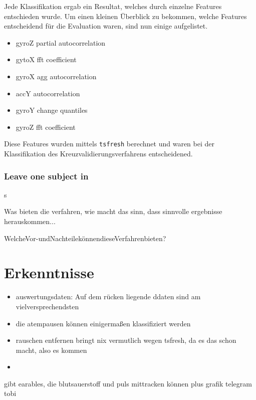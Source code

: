 % 
% 
% 
% 
% 


Jede Klassifikation ergab ein Resultat, welches durch einzelne Features entschieden wurde. 
Um einen kleinen Überblick zu bekommen, welche Features entscheidend für die Evaluation waren, sind nun einige aufgelistet.
\begin{itemize}
    \item gyroZ partial autocorrelation
    \item gytoX fft coefficient
    \item gyroX agg autocorrelation
    \item accY autocorrelation
    \item gyroY change quantiles 
    \item gyroZ fft coefficient
\end{itemize}
Diese Features wurden mittels \texttt{tsfresh} berechnet und waren bei der Klassifikation des Kreuzvalidierungsverfahrens entscheidened.

\subsubsection{Leave one subject in}
s

Was bieten die verfahren, wie macht das sinn, dass sinnvolle ergebnisse herauskommen...

WelcheVor-undNachteilekönnendieseVerfahrenbieten?

\section{Erkenntnisse}
\begin{itemize}
    \item auswertungsdaten: Auf dem rücken liegende ddaten sind am vielversprechendsten
    \item die atempausen können einigermaßen klassifiziert werden
    \item rauschen entfernen bringt nix vermutlich wegen tsfresh, da es das schon macht, also es kommen
    \item 
\end{itemize}


gibt earables, die blutsauerstoff und puls mittracken können
plus grafik telegram tobi